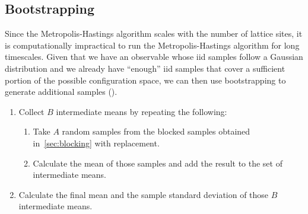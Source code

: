	\subsection{Bootstrapping}\label{sec:bootstrap}
		Since the Metropolis-Hastings algorithm scales with the number of lattice sites, it is computationally impractical to run the Metropolis-Hastings algorithm for long timescales. Given that we have an observable whose iid samples follow a Gaussian distribution and we already have \enquote{enough} iid samples that cover a sufficient portion of the possible configuration space, we can then use bootstrapping to generate additional samples (\citet{bootstrap}).
		\begin{enumerate}
			\item Collect $B$ intermediate means by repeating the following:
			\begin{enumerate}
				\item Take $A$ random samples from the blocked samples obtained in~\cref{sec:blocking} with replacement.
				\item Calculate the mean of those samples and add the result to the set of intermediate means.
			\end{enumerate}
			\item Calculate the final mean and the sample standard deviation of those $B$ intermediate means.
		\end{enumerate}